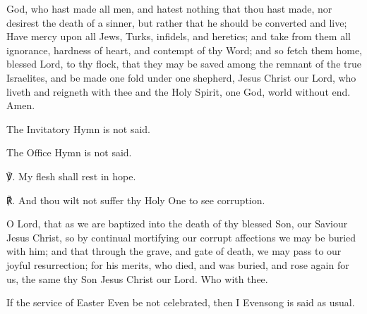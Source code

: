  God, who hast made all men, and hatest nothing that thou hast made, nor desirest the death of a sinner, but rather that he should be converted and live; Have mercy upon all Jews, Turks, infidels, and heretics; and take from them all ignorance, hardness of heart, and contempt of thy Word; and so fetch them home, blessed Lord, to thy flock, that they may be saved among the remnant of the true Israelites, and be made one fold under one shepherd, Jesus Christ our Lord, who liveth and reigneth with thee and the Holy Spirit, one God, world without end. Amen.


\clearpage
{}
\fancyhead[RE,LO]{}

\mattins

\begin{rubric}
	The Invitatory Hymn is not said.
\end{rubric}


\begin{rubric}
	The Office Hymn is not said.
\end{rubric}

℣. My flesh shall rest in hope.

℟. And thou wilt not suffer thy Holy One to see corruption.


\collect
{} O Lord, that as we are baptized into the death of thy blessed Son, our Saviour Jesus Christ, so by continual mortifying our corrupt affections we may be buried with him; and that through the grave, and gate of death, we may pass to our joyful resurrection; for his merits, who died, and was buried, and rose again for us, the same thy Son Jesus Christ our Lord. Who with thee.



\label{EasterDay}


\firstEvensong

\begin{rubric}
	If the service of Easter Even be not celebrated, then I Evensong is said as usual.
\end{rubric}

